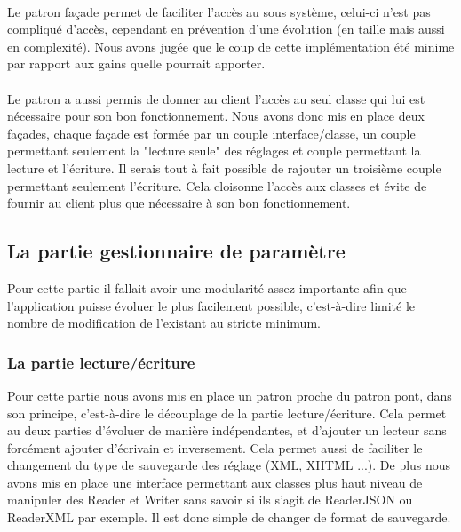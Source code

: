 \documentclass[12pt]{article}
\begin{document}
	\paragraph{}
	Le patron façade permet de faciliter l'accès au sous système, celui-ci n'est pas compliqué d'accès, cependant en prévention d'une évolution (en taille mais aussi en complexité). Nous avons jugée que le coup de cette implémentation été minime par rapport aux gains quelle pourrait apporter.
	
	\paragraph{}
	Le patron a aussi permis de donner au client l'accès au seul classe qui lui est nécessaire pour son bon fonctionnement. Nous avons donc mis en place deux façades, chaque façade est formée par un couple interface/classe, un couple permettant seulement la "lecture seule" des réglages et couple permettant la lecture et l'écriture. Il serais tout à fait possible de rajouter un troisième couple permettant seulement l'écriture. Cela cloisonne l'accès aux classes et évite de fournir au client plus que nécessaire à son bon fonctionnement. 
	
	\newpage
	\subsection{La partie gestionnaire de paramètre}
	
	Pour cette partie il fallait avoir une modularité assez importante afin que l'application puisse évoluer le plus facilement possible, c'est-à-dire limité le nombre de modification de l'existant au stricte minimum.
	
	\subsubsection{La partie lecture/écriture}
	
		Pour cette partie nous avons mis en place un patron proche du patron pont, dans son principe, c'est-à-dire le découplage de la partie lecture/écriture. Cela permet au deux parties d'évoluer de manière indépendantes, et d'ajouter un lecteur sans forcément ajouter d'écrivain et inversement. Cela permet aussi de faciliter le changement du type de sauvegarde des réglage (XML, XHTML ...). De plus nous avons mis en place une interface permettant aux classes plus haut niveau de manipuler des Reader et Writer sans savoir si ils s'agit de ReaderJSON ou ReaderXML par exemple. Il est donc simple de changer de format de sauvegarde.
		
\end{document}
